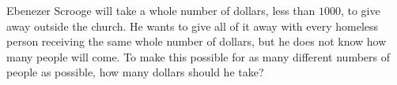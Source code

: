 Ebenezer Scrooge will take a whole number of dollars, less than $1000$, to give away outside the church. He wants to give all of it away with every homeless person receiving the same whole number of dollars, but he does not know how many people will come. To make this possible for as many different numbers of people as possible, how many dollars should he take?
